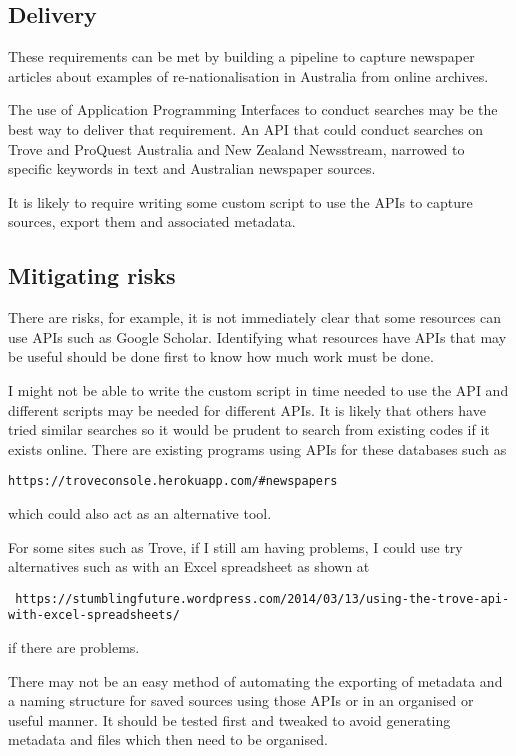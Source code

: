 \documentclass{article}
\begin{document}
\subsection*{Delivery}

These requirements can be met by building a pipeline to capture newspaper articles about examples of re-nationalisation in Australia from online archives.\par

The use of Application Programming Interfaces to conduct searches may be the best way to deliver that requirement. An API that could conduct searches on Trove and ProQuest Australia and New Zealand Newsstream, narrowed to specific keywords in text and Australian newspaper sources.\par

It is likely to require writing some custom script to use the APIs to capture sources, export them and associated metadata.\par 

\subsection*{Mitigating risks}

There are risks, for example, it is not immediately clear that some resources can use APIs such as Google Scholar. Identifying what resources have APIs that may be useful should be done first to know how much work must be done.\par

I might not be able to write the custom script in time needed to use the API and different scripts may be needed for different APIs. It is likely that others have tried similar searches so it would be prudent to search from existing codes if it exists online. There are existing programs using APIs for these databases such as \begin{verbatim}https://troveconsole.herokuapp.com/#newspapers\end{verbatim} which could also act as an alternative tool.\par

For some sites such as Trove, if I still am having problems, I could use try alternatives such as with an Excel spreadsheet as shown at \begin{verbatim} https://stumblingfuture.wordpress.com/2014/03/13/using-the-trove-api-with-excel-spreadsheets/ \end{verbatim}if there are problems.\par

There may not be an easy method of automating the exporting of metadata and a naming structure for saved sources using those APIs or in an organised or useful manner. It should be tested first and tweaked to avoid generating metadata and files which then need to be organised.\par
\end{document}
